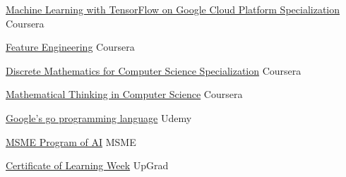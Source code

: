 


\begin{cvhonors}

  \cvhonor
    {\href{https://www.coursera.org/account/accomplishments/specialization/J9UZD5EFK2K2}{Machine Learning with TensorFlow on Google Cloud Platform Specialization}} %
    {} %
    {} %
    {Coursera} %

  \cvhonor
    {\href{https://www.coursera.org/account/accomplishments/verify/6C3CJAHKPV7L}{Feature Engineering}} %
    {} %
    {} %
    {Coursera} %

  \cvhonor
    {\href{https://www.coursera.org/account/accomplishments/specialization/WEEYW6XWSU7L}{Discrete Mathematics for Computer Science Specialization}} %
    {} %
    {} %
    {Coursera} %

  \cvhonor
    {\href{https://www.coursera.org/account/accomplishments/verify/3UH6YNF4KAAF}{Mathematical Thinking in Computer Science}} %
    {} %
    {} %
    {Coursera} %

  \cvhonor
    {\href{https://www.udemy.com/certificate/UC-1XUUD8K6/}{Google's go programming language}} %
    {} %
    {} %
    {Udemy} %


  \cvhonor
    {\href{https://drive.google.com/file/d/1tanztQqf2h5stmWmK1B_yl5tqUf5cCH1/view?usp=drivesdk}{MSME Program of AI}} %
    {} %
    {} %
    {MSME} %

  \cvhonor
    {\href{https://www.credential.net/ci70t0zw}{Certificate of Learning Week}} %
    {} %
    {} %
    {UpGrad} %



\end{cvhonors}


